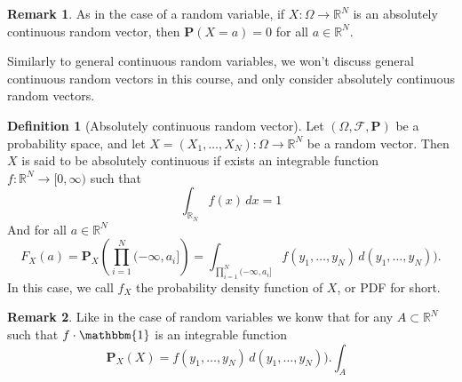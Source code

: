 \documentclass[11pt,a4paper]{article}
\theoremstyle{definition}
\newtheorem{definition}{Definition}[section]
\newtheorem{remark}{Remark}[section]
\theoremstyle{plain}
\newcommand{\R}{\mathbb{R}}
\begin{document}
  \begin{remark}
    As in the case of a random variable, if $X \colon \Omega \to \R^N$ is
    an absolutely continuous random vector, 
    then $\mathbf P(X = a) = 0$ for all $a \in \R^N$.
  \end{remark}
  
  Similarly to general continuous random variables, we won't discuss
  general continuous random vectors in this course, and only consider
  absolutely continuous random vectors.

  \begin{definition}[Absolutely continuous random vector]
    Let $(\Omega, \mathcal F, \mathbf P)$ be a probability space, 
    and let $X = (X_1,\dots,X_N) \colon \Omega \to \R^N$ be a random vector.
    Then $X$ is said to be absolutely continuous if exists an integrable 
    function $f \colon \R^N \to [0,\infty)$ such that 
    \[
      \int_{\R_N} f(x)\,dx = 1
    \]
    And for all $a \in \R^N$
    \[
      F_X(a) = 
      \mathbf P_X\left(\prod_{i=1}^{N} (-\infty,a_i]\right) =
      \int_{\prod_{i=1}^{N} (-\infty,a_i]} f(y_1,\dots,y_N)\,d(y_1,\dots,y_N)).
    \]
    In this case, we call $f_X$ the probability density function of $X$,
    or PDF for short.
  \end{definition}

  \begin{remark}
    Like in the case of random variables we konw that for any $A \subset \R^N$
    such that $f \cdot \mathbbm{1}$ is an integrable function
    \[
      \mathbf P_X(X) = f(y_1,\dots,y_N)\,d(y_1,\dots,y_N)).
      \int_{A}
    \]
  \end{remark}
\end{document}

